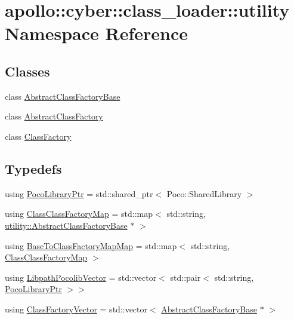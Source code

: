 \hypertarget{namespaceapollo_1_1cyber_1_1class__loader_1_1utility}{\section{apollo\-:\-:cyber\-:\-:class\-\_\-loader\-:\-:utility Namespace Reference}
\label{namespaceapollo_1_1cyber_1_1class__loader_1_1utility}
}
\subsection*{Classes}
\begin{DoxyCompactItemize}
\item 
class \hyperlink{classapollo_1_1cyber_1_1class__loader_1_1utility_1_1AbstractClassFactoryBase}{Abstract\-Class\-Factory\-Base}
\item 
class \hyperlink{classapollo_1_1cyber_1_1class__loader_1_1utility_1_1AbstractClassFactory}{Abstract\-Class\-Factory}
\item 
class \hyperlink{classapollo_1_1cyber_1_1class__loader_1_1utility_1_1ClassFactory}{Class\-Factory}
\end{DoxyCompactItemize}
\subsection*{Typedefs}
\begin{DoxyCompactItemize}
\item 
using \hyperlink{namespaceapollo_1_1cyber_1_1class__loader_1_1utility_abe591df068142cddd76a66dd4f8277e7}{Poco\-Library\-Ptr} = std\-::shared\-\_\-ptr$<$ Poco\-::\-Shared\-Library $>$
\item 
using \hyperlink{namespaceapollo_1_1cyber_1_1class__loader_1_1utility_a4cf2c311509ec13f7d3c5d1516bcc590}{Class\-Class\-Factory\-Map} = std\-::map$<$ std\-::string, \hyperlink{classapollo_1_1cyber_1_1class__loader_1_1utility_1_1AbstractClassFactoryBase}{utility\-::\-Abstract\-Class\-Factory\-Base} $\ast$ $>$
\item 
using \hyperlink{namespaceapollo_1_1cyber_1_1class__loader_1_1utility_af56a53fd55c852ce98e9135bdff04cbc}{Base\-To\-Class\-Factory\-Map\-Map} = std\-::map$<$ std\-::string, \hyperlink{namespaceapollo_1_1cyber_1_1class__loader_1_1utility_a4cf2c311509ec13f7d3c5d1516bcc590}{Class\-Class\-Factory\-Map} $>$
\item 
using \hyperlink{namespaceapollo_1_1cyber_1_1class__loader_1_1utility_a1cb3907890434c1bb35adf496751b6f7}{Libpath\-Pocolib\-Vector} = std\-::vector$<$ std\-::pair$<$ std\-::string, \hyperlink{namespaceapollo_1_1cyber_1_1class__loader_1_1utility_abe591df068142cddd76a66dd4f8277e7}{Poco\-Library\-Ptr} $>$$>$
\item 
using \hyperlink{namespaceapollo_1_1cyber_1_1class__loader_1_1utility_acb2be87bf5f4284e4ea493f4238073dc}{Class\-Factory\-Vector} = std\-::vector$<$ \hyperlink{classapollo_1_1cyber_1_1class__loader_1_1utility_1_1AbstractClassFactoryBase}{Abstract\-Class\-Factory\-Base} $\ast$ $>$
\end{DoxyCompactItemize}
